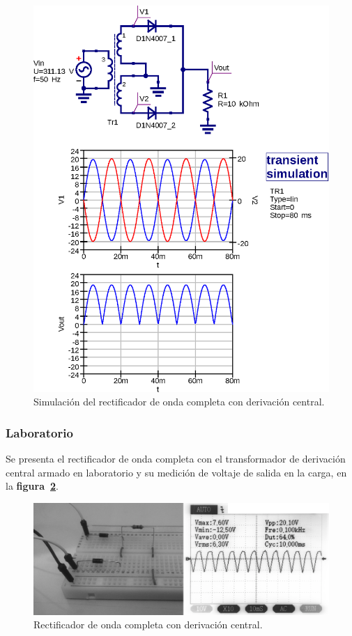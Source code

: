 \begin{figure}[!h]
\centering
\includegraphics[scale=0.75]{simulacion/03.derivacion_central1.eps}
\caption{Simulación del rectificador de onda completa con derivación central.}
\label{simulacion03}
\end{figure}

\subsubsection{Laboratorio}
Se presenta el rectificador de onda completa con el transformador de derivación
central armado en laboratorio y su medición de voltaje de salida en la carga, en
la \textbf{figura~\ref{laboratorio05}}.

\begin{figure}[!h]
\centering
\includegraphics[scale=0.34]{fotos/03.derivacion_central1.eps}
\caption{Rectificador de onda completa con derivación central.}
\label{laboratorio05}
\end{figure}

